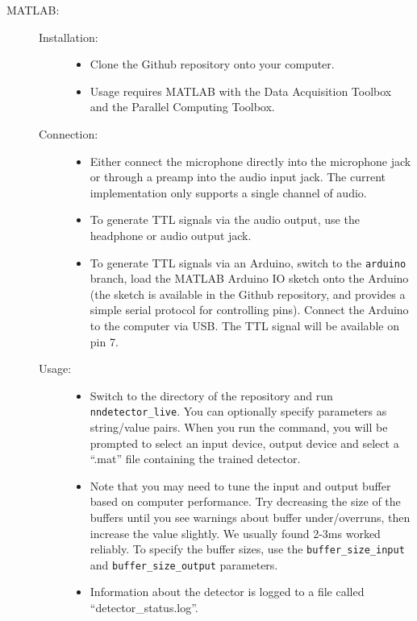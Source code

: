 \documentclass[10pt,letterpaper]{article}
\providecommand{\DIFaddtex}[1]{{\protect\color{blue}\uwave{#1}}} %
\providecommand{\DIFaddbegin}{} %
\providecommand{\DIFaddend}{} %
\providecommand{\DIFadd}[1]{\texorpdfstring{\DIFaddtex{#1}}{#1}} %
\newcommand{\DIFaddincludegraphics}[2][]{{\color{blue}\fbox{\DIFOincludegraphics[#1]{#2}}}} %
\DeclareRobustCommand{\DIFaddbegin}{\DIFOaddbegin \let\includegraphics\DIFaddincludegraphics} %
\DeclareRobustCommand{\DIFaddend}{\DIFOaddend \let\includegraphics\DIFOincludegraphics} %
\begin{document}
\begin{description}
\begin{description}
  \DIFaddend \item[MATLAB:]\DIFaddbegin \hfill
    \DIFaddend \begin{description}
    \item[Installation:]\hfill
      \begin{itemize}
      \item Clone the Github repository onto your computer.
      \item Usage requires MATLAB with the Data Acquisition Toolbox and the 
      Parallel Computing Toolbox.
      \end{itemize}
    \item[Connection:]\hfill
      \begin{itemize}
      \item Either connect the microphone directly into the microphone jack or through a 
      preamp into the audio input jack. The current implementation only supports a single 
      channel of audio.
      \item To generate TTL signals via the audio output, use the headphone or audio output
      jack.
      \item To generate TTL signals via an Arduino, switch to the {\tt arduino} branch, 
      load the MATLAB Arduino IO sketch onto the Arduino (the sketch is available in the 
      Github repository, and provides a simple serial protocol for controlling pins). 
      Connect the Arduino to the computer via USB. The TTL signal will be available on
      pin 7.
      \end{itemize}
    \item[Usage:]\hfill
      \begin{itemize}
      \item Switch to the directory of the repository and run {\tt nndetector\_live}. You
      can optionally specify parameters as string/value pairs. When you run the command,
      you will be prompted to select an input device, output device and select a ``.mat''
      file containing the trained detector.
      \item Note that you may need to tune the input and output buffer based on computer 
      performance. Try decreasing the size of the buffers until you see warnings about buffer
      under/overruns, then increase the value slightly. We usually found 2-3ms worked reliably.
      To specify the buffer sizes, use the {\tt buffer\_size\_input} and 
      {\tt buffer\_size\_output} parameters.
      \item Information about the detector is logged to a file called ``detector\_status.log''.
      \end{itemize}
    \end{description}
    \DIFaddbegin 


\end{description}
\end{description}
\end{document}
